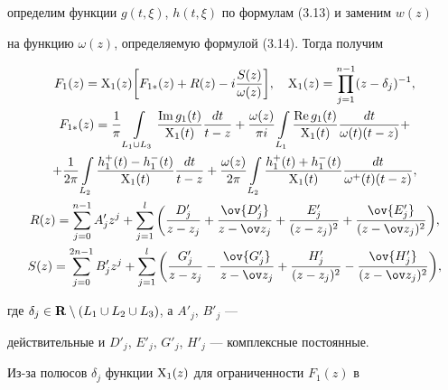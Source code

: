 определим функции $g(t,\xi)$, $h(t,\xi)$ по формулам (3.13) и заменим $w(z)$ 


на функцию $\omega(z)$, определяемую формулой (3.14). Тогда получим 


\begin{gather} 


F_1(z)=\X_1(z)\bigg[F_{1\ast}(z)+R(z)-i\frac{S(z)}{\omega(z)}\bigg], 


\quad \X_1(z)=\prod^{n-1}_{j=1}(z-\delta_j)^{-1},\\ 


%


F_{1\ast}(z)=\frac{1}{\pi}\int\limits_{L_1\cup L_3} 


\frac{\im g_1(t)}{\X_1(t)}\frac{dt}{t-z}+\frac{\omega(z)}{\pi i} 


\int\limits_{L_1}\frac{\re g_1(t)}{\X_1(t)} 


\frac{dt}{\omega(t)(t-z)}+\notag \\ 


%


+\frac{1}{2\pi}\int\limits_{L_2} 


\frac{h^+_1(t)-h^-_1(t)}{\X_1(t)}\frac{dt}{t-z}+ 


\frac{\omega(z)}{2\pi}\int\limits_{L_2} 


\frac{h^+_1(t)+h^-_1(t)}{\X_1(t)}\frac{dt}{\omega^+(t)(t-z)},\notag\\ 


%


R(z)=\sum^{n-1}_{j=0}A'_j z^j+\sum^l_{j=1}\bigg( 


\frac{D'_j}{z-z_j}+\frac{\ov{D'_j}}{z-\ov z_j}+ 


\frac{E'_j}{(z-z_j)^2}+\frac{\ov{E'_j}}{(z-\ov z_j)^2} 


\bigg),\notag\\ 


% 


S(z)=\sum^{2n-1}_{j=0}B'_j z^j+\sum^l_{j=1}\bigg( 


\frac{G'_j}{z-z_j}-\frac{\ov{G'_j}}{z-\ov z_j}+ 


\frac{H'_j}{(z-z_j)^2}-\frac{\ov{H'_j}}{(z-\ov z_j)^2}\bigg),\notag


\end{gather} 


где $\delta_j\in\bold R\setminus(L_1\cup L_2\cup L_3)$, а $A'_j$, $B'_j$ --- 


действительные и $D'_j$, $E'_j$, $G'_j$, $H'_j$ --- комплексные постоянные. 


Из-за полюсов $\delta_j$ функции $\mathrm X_1(z)$ для ограниченности $F_1(z)$ в 


